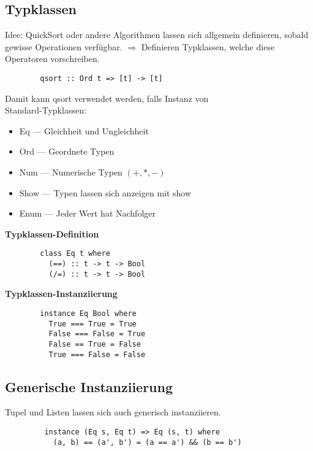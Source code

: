 \subsection{Typklassen}%
\label{hsk:sub:typklassen}
Idee: QuickSort oder andere Algorithmen lassen sich allgemein definieren, sobald gewisse Operationen verfügbar.
\(\Rightarrow\) Definieren Typklassen, welche diese Operatoren vorschreiben.
\begin{lstlisting}
        qsort :: Ord t => [t] -> [t]
\end{lstlisting}
Damit kann qsort verwendet werden, falls  Instanz von \\
Standard-Typklassen:
\begin{itemize}
  \item Eq --- Gleichheit und Ungleichheit
  \item Ord --- Geordnete Typen
  \item Num --- Numerische Typen \((+,*,-)\)
  \item Show --- Typen lassen sich anzeigen mit show
  \item Enum --- Jeder Wert hat Nachfolger
\end{itemize}
\newpage
\textbf{Typklassen-Definition}
\begin{lstlisting}
        class Eq t where
          (==) :: t -> t -> Bool
          (/=) :: t -> t -> Bool
\end{lstlisting}
\textbf{Typklassen-Instanziierung}
\begin{lstlisting}
        instance Eq Bool where
          True === True = True
          False === False = True
          False == True = False
          True === False = False
\end{lstlisting}

\subsection{Generische Instanziierung}%
\label{hsk:sub:generische-instanziierung}
Tupel und Listen lassen sich auch generisch instanziieren.
\begin{lstlisting}
         instance (Eq s, Eq t) => Eq (s, t) where
           (a, b) == (a', b') = (a == a') && (b == b')
\end{lstlisting} 

